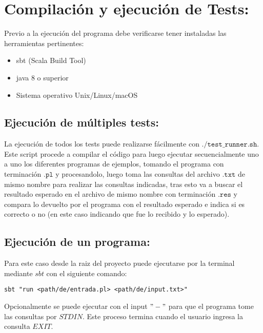 \section{Compilación y ejecución de Tests:}

Previo a la ejecución del programa debe verificarse tener instaladas las herramientas pertinentes:
\begin{itemize}
	\item sbt (Scala Build Tool)
	\item java 8 o superior
	\item Sistema operativo Unix/Linux/macOS
\end{itemize}
	
\subsection{Ejecución de múltiples tests:}
La ejecución de todos los tests puede realizarse fácilmente con $\texttt{./test\_runner.sh}$. Este script procede a compilar el código para luego ejecutar secuencialmente uno a uno los diferentes programas de ejemplos, tomando el programa con terminación $\texttt{.pl}$ y procesandolo, luego toma las consultas del archivo $\texttt{.txt}$ de mismo nombre para realizar las consultas indicadas, tras esto va a buscar el resultado esperado en el archivo de mismo nombre con terminación $\texttt{.res}$ y compara lo devuelto por el programa con el resultado esperado e indica si es correcto o no (en este caso indicando que fue lo recibido y lo esperado). 

\subsection{Ejecución de un programa:}
Para este caso desde la raiz del proyecto puede ejecutarse por la terminal mediante $sbt$ con el siguiente comando:

\verb|sbt "run <path/de/entrada.pl> <path/de/input.txt>"|

Opcionalmente se puede ejecutar con el input $"-"$ para que el programa tome las consultas por $STDIN$. Este proceso termina cuando el usuario ingresa la consulta $EXIT$.


\pagebreak

